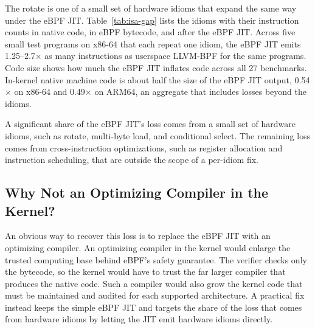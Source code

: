 

The rotate is one of a small set of hardware idioms that expand the same way under the eBPF JIT.
Table~\ref{tab:isa-gap} lists the idioms with their instruction counts in native code, in eBPF bytecode, and after the eBPF JIT.
Across five small test programs on x86-64 that each repeat one idiom, the eBPF JIT emits 1.25--2.7$\times$ as many instructions as userspace LLVM-BPF for the same programs.
Code size shows how much the eBPF JIT inflates code across all 27 benchmarks.
In-kernel native machine code is about half the size of the eBPF JIT output, 0.54$\times$ on x86-64 and 0.49$\times$ on ARM64, an aggregate that includes losses beyond the idioms.

\begin{finding}
\finlabel A significant share of the eBPF JIT's loss comes from a small set of hardware idioms, such as rotate, multi-byte load, and conditional select. The remaining loss comes from cross-instruction optimizations, such as register allocation and instruction scheduling, that are outside the scope of a per-idiom fix.
\end{finding}



\subsection{Why Not an Optimizing Compiler in the Kernel?}
\label{subsec:char-challenges}

An obvious way to recover this loss is to replace the eBPF JIT with an optimizing compiler.
An optimizing compiler in the kernel would enlarge the trusted computing base behind eBPF's safety guarantee.
The verifier checks only the bytecode, so the kernel would have to trust the far larger compiler that produces the native code.
Such a compiler would also grow the kernel code that must be maintained and audited for each supported architecture.
A practical fix instead keeps the simple eBPF JIT and targets the share of the loss that comes from hardware idioms by letting the JIT emit hardware idioms directly.

